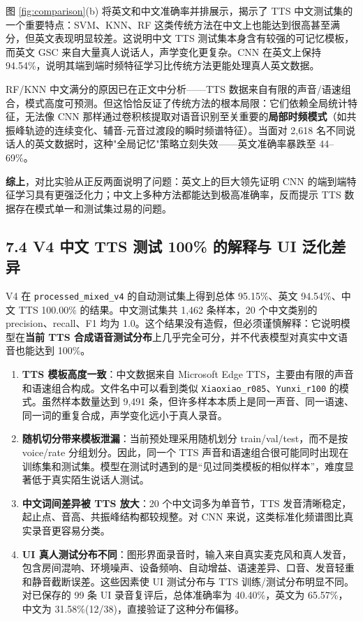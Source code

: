 ﻿\documentclass[12pt,a4paper]{article}
\begin{document}
图 \ref{fig:comparison}(b) 将英文和中文准确率并排展示，揭示了 TTS 中文测试集的一个重要特点：SVM、KNN、RF 这类传统方法在中文上也能达到很高甚至满分，但英文表现明显较差。这说明中文 TTS 测试集本身含有较强的可记忆模板，而英文 GSC 来自大量真人说话人，声学变化更复杂。CNN 在英文上保持 94.54\%，说明其端到端时频特征学习比传统方法更能处理真人英文数据。

RF/KNN 中文满分的原因已在正文中分析——TTS 数据来自有限的声音/语速组合，模式高度可预测。但这恰恰反证了传统方法的根本局限：它们依赖全局统计特征，无法像 CNN 那样通过卷积核提取对语音识别至关重要的\textbf{局部时频模式}（如共振峰轨迹的连续变化、辅音-元音过渡段的瞬时频谱特征）。当面对 2,618 名不同说话人的英文数据时，这种"全局记忆"策略立刻失效——英文准确率暴跌至 44--69\%。

\textbf{综上}，对比实验从正反两面说明了问题：英文上的巨大领先证明 CNN 的端到端特征学习具有更强泛化力；中文上多种方法都能达到极高准确率，反而提示 TTS 数据存在模式单一和测试集过易的问题。

\subsection*{7.4 V4 中文 TTS 测试 100\% 的解释与 UI 泛化差异}

V4 在 \texttt{processed\_mixed\_v4} 的自动测试集上得到总体 95.15\%、英文 94.54\%、中文 TTS 100.00\% 的结果。中文测试集共 1,462 条样本，20 个中文类别的 precision、recall、F1 均为 1.0。这个结果没有造假，但必须谨慎解释：它说明模型在\textbf{当前 TTS 合成语音测试分布}上几乎完全可分，并不代表模型对真实中文语音也能达到 100\%。

\begin{enumerate}[leftmargin=*]
\item \textbf{TTS 模板高度一致}：中文数据来自 Microsoft Edge TTS，主要由有限的声音和语速组合构成。文件名中可以看到类似 \texttt{Xiaoxiao\_r085}、\texttt{Yunxi\_r100} 的模式。虽然样本数量达到 9,491 条，但许多样本本质上是同一声音、同一语速、同一词的重复合成，声学变化远小于真人录音。
\item \textbf{随机切分带来模板泄漏}：当前预处理采用随机划分 train/val/test，而不是按 voice/rate 分组划分。因此，同一个 TTS 声音和语速组合很可能同时出现在训练集和测试集。模型在测试时遇到的是“见过同类模板的相似样本”，难度显著低于真实陌生说话人测试。
\item \textbf{中文词间差异被 TTS 放大}：20 个中文词多为单音节，TTS 发音清晰稳定，起止点、音高、共振峰结构都较规整。对 CNN 来说，这类标准化频谱图比真实录音更容易分类。
\item \textbf{UI 真人测试分布不同}：图形界面录音时，输入来自真实麦克风和真人发音，包含房间混响、环境噪声、设备频响、自动增益、语速差异、口音、发音轻重和静音截断误差。这些因素使 UI 测试分布与 TTS 训练/测试分布明显不同。对已保存的 99 条 UI 录音复评后，总体准确率为 40.40\%，英文为 65.57\%，中文为 31.58\%(12/38)，直接验证了这种分布偏移。
\end{enumerate}
\end{document}
